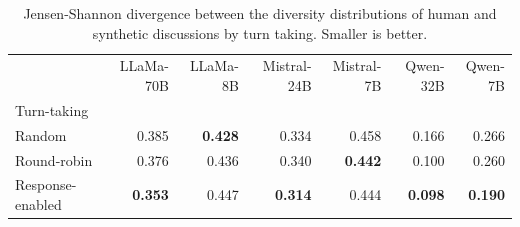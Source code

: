 \begin{table}[ht]
\caption{Jensen-Shannon divergence between the diversity distributions  of human and synthetic discussions by turn taking. Smaller is better.}
\label{tab:divergence-turn_taking}
\begin{tabular}{lrrrrrr}
\toprule
& LLaMa-70B & LLaMa-8B & Mistral-24B & Mistral-7B & Qwen-32B & Qwen-7B \\
Turn-taking &  &  &  &  &  &  \\
\midrule
Random & 0.385 & \textbf{0.428} & 0.334 & 0.458 & 0.166 & 0.266 \\
Round-robin & 0.376 & 0.436 & 0.340 & \textbf{0.442} & 0.100 & 0.260 \\
Response-enabled & \textbf{0.353} & 0.447 & \textbf{0.314} & 0.444 & \textbf{0.098} & \textbf{0.190} \\
\bottomrule
\end{tabular}
\end{table}
